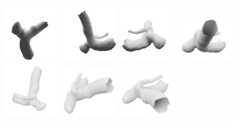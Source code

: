 \documentclass[%
 reprint,
 amsmath,amssymb,
 aps,
 floatfix,
 nofootinbib,
]{revtex4-2}
\begin{document}
\begin{figure}
  \centering
  \begin{subfigure}[b]{0.35\textwidth}
    \centering
    \includegraphics[width=0.22\textwidth]{003.png}
    \includegraphics[width=0.22\textwidth]{016.png}
    \includegraphics[width=0.22\textwidth]{030.png}
    \includegraphics[width=0.22\textwidth]{087.png}
    \vspace{0.2cm} %
    \includegraphics[width=0.22\textwidth]{129.png}
    \includegraphics[width=0.22\textwidth]{131.png}
    \includegraphics[width=0.22\textwidth]{135.png}

\end{subfigure}
\end{figure}
\end{document}
